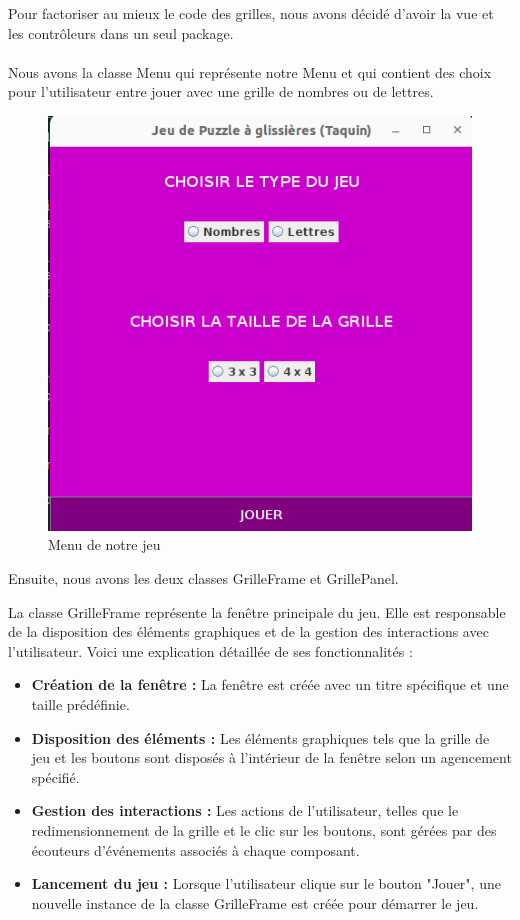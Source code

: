 \documentclass[a4paper,10pt]{article}
\begin{document}
\vspace{0.5cm}
Pour factoriser au mieux le code des grilles, nous avons décidé d'avoir la vue et les contrôleurs dans un seul package. \\ \\
Nous avons la classe Menu qui représente notre Menu et qui contient des choix pour l'utilisateur entre jouer avec une grille de nombres ou de lettres.

\begin{figure}[H]
\centering
\includegraphics[scale=0.6]{captures/menu.png}
\caption{Menu de notre jeu}
\end{figure}

Ensuite, nous avons les deux classes GrilleFrame et GrillePanel.

La classe GrilleFrame représente la fenêtre principale du jeu. Elle est responsable de la disposition des éléments graphiques et de la gestion des interactions avec l'utilisateur. Voici une explication détaillée de ses fonctionnalités :

\begin{itemize}
\item \textbf{Création de la fenêtre :} La fenêtre est créée avec un titre spécifique et une taille prédéfinie.
\item \textbf{Disposition des éléments :} Les éléments graphiques tels que la grille de jeu et les boutons sont disposés à l'intérieur de la fenêtre selon un agencement spécifié.
\item \textbf{Gestion des interactions :} Les actions de l'utilisateur, telles que le redimensionnement de la grille et le clic sur les boutons, sont gérées par des écouteurs d'événements associés à chaque composant.
\item \textbf{Lancement du jeu :} Lorsque l'utilisateur clique sur le bouton "Jouer", une nouvelle instance de la classe GrilleFrame est créée pour démarrer le jeu.
\end{itemize}
\end{document}
